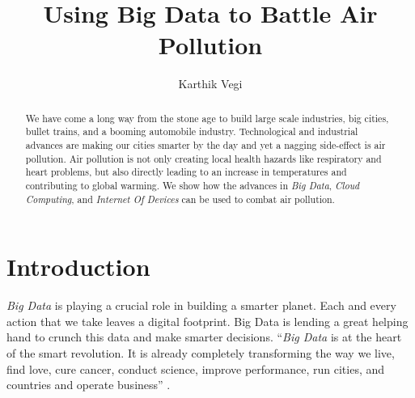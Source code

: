 \documentclass[sigconf]{acmart}
\begin{document}
\title{Using Big Data to Battle Air Pollution}

\author{Karthik Vegi}


\renewcommand{\shortauthors}{kvegi}


\begin{abstract}
We have come a long way from the stone age to build large scale industries, big cities, bullet trains, and a booming automobile industry. Technological and industrial advances are making our cities smarter by the day and yet a nagging side-effect is air pollution. Air pollution is not only creating local health hazards like respiratory and heart problems, but also directly leading to an increase in temperatures and contributing to global warming. We show how the advances in {\em Big Data}, {\em Cloud Computing}, and {\em Internet Of Devices} can be used to combat air pollution.
\end{abstract}


\maketitle

\section{Introduction}

{\em Big Data} is playing a crucial role in building a smarter planet. Each and every action that we take leaves a digital footprint. Big Data is lending a great helping hand to crunch this data and make smarter decisions. ``{\em Big Data} is at the heart of the smart revolution. It is already completely transforming the way we live, find love, cure cancer, conduct science, improve performance, run cities, and countries and operate business'' \cite{Marr2015}.  


 
\end{document}
